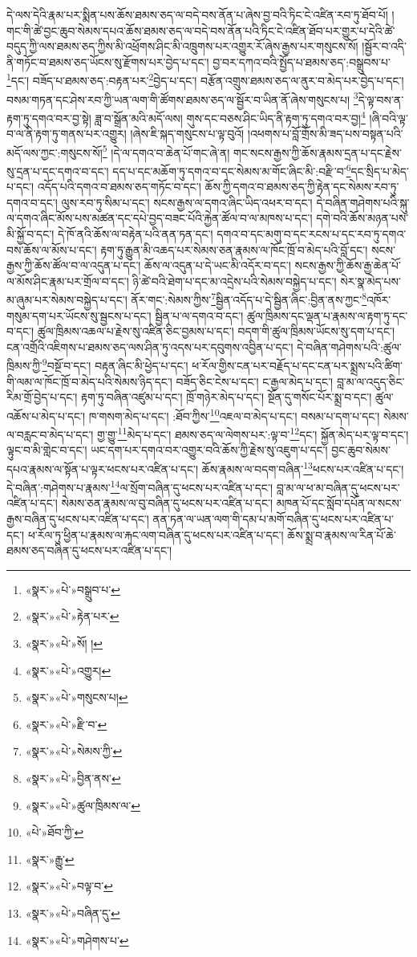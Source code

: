 དེ་ལས་དེའི་རྣམ་པར་སྨིན་པས་ཆོས་ཐམས་ཅད་ལ་བདེ་བས་ནོན་པ་ཞེས་བྱ་བའི་ཏིང་ངེ་འཛིན་རབ་ཏུ་ཐོབ་པོ། །གང་གི་ཚེ་བྱང་ཆུབ་སེམས་དཔའ་ཆོས་ཐམས་ཅད་ལ་བདེ་བས་ནོན་པའི་ཏིང་ངེ་འཛིན་ཐོབ་པར་གྱུར་པ་དེའི་ཚེ་བདུད་ཀྱི་ལས་ཐམས་ཅད་ཀྱིས་མི་འཕྲོགས་ཤིང་མི་འཁྲུགས་པར་འགྱུར་རོ་ཞེས་རྒྱས་པར་གསུངས་སོ། །སྦྱོར་བ་འདི་ནི་གཏོང་བ་ཐམས་ཅད་ཡོངས་སུ་རྫོགས་པར་བྱེད་པ་དང་། བྱ་བར་དཀའ་བའི་སྤྱོད་པ་ཐམས་ཅད་:བསྒྲུབས་པ་\footnote{«སྣར་»«པེ་»བསྒྲུབ་པ་}དང་། བཟོད་པ་ཐམས་ཅད་:བརྟན་པར་\footnote{«སྣར་»«པེ་»རྟེན་པར་}བྱེད་པ་དང་། བརྩོན་འགྲུས་ཐམས་ཅད་ལ་ནུར་བ་མེད་པར་བྱེད་པ་དང་། བསམ་གཏན་དང་ཤེས་རབ་ཀྱི་ཡན་ལག་གི་ཚོགས་ཐམས་ཅད་ལ་སྦྱོར་བ་ཡིན་ནོ་ཞེས་གསུངས་པ། \footnote{«སྣར་»«པེ་»སོ། ། }དེ་ལྟ་བས་ན་རྟག་ཏུ་དགའ་བར་བྱ་སྟེ། ཟླ་བ་སྒྲོན་མའི་མདོ་ལས། གུས་དང་བཅས་ཤིང་ཡིད་ནི་རྟག་ཏུ་དགའ་བར་བྱ།\footnote{«སྣར་»«པེ་»འགྱུར།} །ཞི་བའི་ལྟ་བ་ལ་ནི་རྟག་ཏུ་གནས་པར་འགྱུར། །ཞེས་ཇི་སྐད་གསུངས་པ་ལྟ་བུའོ། །འཕགས་པ་བློ་གྲོས་མི་ཟད་པས་བསྟན་པའི་མདོ་ལས་ཀྱང་:གསུངས་སོ།\footnote{«སྣར་»«པེ་»གསུངས་པ།} །དེ་ལ་དགའ་བ་ཆེན་པོ་གང་ཞེ་ན། གང་སངས་རྒྱས་ཀྱི་ཆོས་རྣམས་དྲན་པ་དང་རྗེས་སུ་དྲན་པ་དང་དགའ་བ་དང་། དད་པ་དང་མཆོག་ཏུ་དགའ་བ་དང་སེམས་མ་གོང་ཞིང་མི་:བརྫི་བ་\footnote{«སྣར་»«པེ་»རྫི་བ་}དང་སྲིད་པ་མེད་པ་དང་། འདོད་པའི་དགའ་བ་ཐམས་ཅད་གཏོང་བ་དང་། ཆོས་ཀྱི་དགའ་བ་ཐམས་ཅད་ཀྱི་རྟེན་དང་སེམས་རབ་ཏུ་དགའ་བ་དང་། ལུས་རབ་ཏུ་སིམ་པ་དང་། སངས་རྒྱས་ལ་དགའ་ཞིང་ཡིད་འཕར་བ་དང་། དེ་བཞིན་གཤེགས་པའི་སྐུ་ལ་དགའ་ཞིང་མོས་པས་མཚན་དང་དཔེ་བྱད་བཟང་པོའི་རྐྱེན་ཚོལ་བ་ལ་མཁས་པ་དང་། དགེ་བའི་ཆོས་མཉན་པས་མི་སྐྱོ་བ་དང་། དེ་ཁོ་ནའི་ཆོས་ལ་བརྟེན་པའི་ནན་ཏན་དང་། དགའ་བ་དང་མགུ་བ་དང་རངས་པ་དང་རབ་ཏུ་དགའ་བས་ཆོས་ལ་མོས་པ་དང་། རྟག་ཏུ་རྒྱུན་མི་འཆད་པར་སེམས་ཅན་རྣམས་ལ་ཁོང་ཁྲོ་བ་མེད་པའི་བློ་དང་། སངས་རྒྱས་ཀྱི་ཆོས་ཚོལ་བ་ལ་འདུན་པ་དང་། ཆོས་ལ་འདུན་པ་དེ་ཡང་མི་འདོར་བ་དང་། སངས་རྒྱས་ཀྱི་ཆོས་རྒྱ་ཆེན་པོ་ལ་མོས་ཤིང་རྣམ་པར་གྲོལ་བ་དང་། ཉི་ཚེ་བའི་ཐེག་པ་དང་མ་འདྲེས་པའི་སེམས་བསྐྱེད་པ་དང་། སེར་སྣ་མེད་པས་མ་ཞུམ་པར་སེམས་བསྐྱེད་པ་དང་། ནོར་གང་:སེམས་ཀྱིས་\footnote{«སྣར་»«པེ་»སེམས་ཀྱི་}སྦྱིན་འདོད་པ་དེ་སྦྱིན་ཞིང་:བྱིན་ནས་ཀྱང་\footnote{«སྣར་»«པེ་»བྱིན་ནས་}འཁོར་གསུམ་དག་པར་ཡོངས་སུ་སྦྱངས་པ་དང་། སྦྱིན་པ་ལ་དགའ་བ་དང་། ཚུལ་ཁྲིམས་དང་ལྡན་པ་རྣམས་ལ་རྟག་ཏུ་དང་བ་དང་། ཚུལ་ཁྲིམས་འཆལ་པ་རྗེས་སུ་འཛིན་ཅིང་བྱམས་པ་དང་། བདག་གི་ཚུལ་ཁྲིམས་ཡོངས་སུ་དག་པ་དང་། ངན་འགྲོའི་འཇིགས་པ་ཐམས་ཅད་ལས་ཤིན་ཏུ་འདས་པར་དབུགས་འབྱིན་པ་དང་། དེ་བཞིན་གཤེགས་པའི་:ཚུལ་ཁྲིམས་ཀྱི་\footnote{«སྣར་»«པེ་»ཚུལ་ཁྲིམས་ལ་}བསྔོ་བ་དང་། བརྟན་ཞིང་མི་ཕྱེད་པ་དང་། ཕ་རོལ་གྱིས་ངན་པར་བརྗོད་པ་དང་ངན་པར་སྨྲས་པའི་ཚིག་གི་ལམ་ལ་ཁོང་ཁྲོ་བ་མེད་པའི་སེམས་ཉིད་དང་། བཟོད་ཅིང་ངེས་པ་དང་། ང་རྒྱལ་མེད་པ་དང་། བླ་མ་ལ་འདུད་ཅིང་རིམ་གྲོ་བྱེད་པ་དང་། རྟག་ཏུ་བཞིན་འཛུམ་པ་དང་། ཁྲོ་གཉེར་མེད་པ་དང་། སྔོན་དུ་གསོང་པོར་སྨྲ་བ་དང་། ཚུལ་འཆོས་པ་མེད་པ་དང་། ཁ་གསག་མེད་པ་དང་། :ཐོབ་ཀྱིས་\footnote{«པེ་»ཐོབ་ཀྱི་}འཇལ་བ་མེད་པ་དང་། བསམ་པ་དག་པ་དང་། སེམས་ལ་བརླང་བ་མེད་པ་དང་། གྱ་གྱུ་\footnote{«སྣར་»རྒྱུ་}མེད་པ་དང་། ཐམས་ཅད་ལ་ལེགས་པར་:ལྟ་བ་\footnote{«སྣར་»«པེ་»བལྟ་བ་}དང་། སྐྱོན་མེད་པར་ལྟ་བ་དང་། ལྟུང་བ་མི་གླེང་བ་དང་། ཡང་དག་པར་དགའ་བར་འགྱུར་བའི་ཆོས་ཀྱི་རྗེས་སུ་འཇུག་པ་དང་། བྱང་ཆུབ་སེམས་དཔའ་རྣམས་ལ་སྟོན་པ་ལྟར་ཕངས་པར་འཛིན་པ་དང་། ཆོས་རྣམས་ལ་བདག་བཞིན་\footnote{«སྣར་»«པེ་»བཞིན་དུ་}ཕངས་པར་འཛིན་པ་དང་། དེ་བཞིན་:གཤེགས་པ་རྣམས་\footnote{«སྣར་»«པེ་»གཤེགས་པ་}ལ་སྲོག་བཞིན་དུ་ཕངས་པར་འཛིན་པ་དང་། བླ་མ་ལ་ཕ་མ་བཞིན་དུ་ཕངས་པར་འཛིན་པ་དང་། སེམས་ཅན་རྣམས་ལ་བུ་བཞིན་དུ་ཕངས་པར་འཛིན་པ་དང་། མཁན་པོ་དང་སློབ་དཔོན་ལ་སངས་རྒྱས་བཞིན་དུ་ཕངས་པར་འཛིན་པ་དང་། ནན་ཏན་ལ་ཡན་ལག་གི་དམ་པ་མགོ་བཞིན་དུ་ཕངས་པར་འཛིན་པ་དང་། ཕ་རོལ་ཏུ་ཕྱིན་པ་རྣམས་ལ་རྐང་ལག་བཞིན་དུ་ཕངས་པར་འཛིན་པ་དང་། ཆོས་སྨྲ་བ་རྣམས་ལ་རིན་པོ་ཆེ་ཐམས་ཅད་བཞིན་དུ་ཕངས་པར་འཛིན་པ་དང་། 